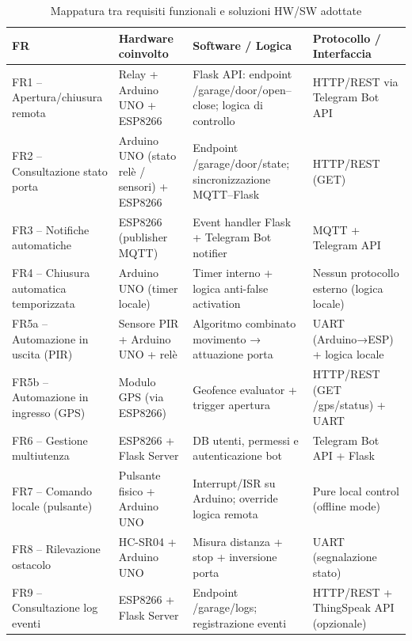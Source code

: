 \begin{table}[H] \centering \caption{Mappatura tra requisiti funzionali e soluzioni HW/SW adottate} \label{tab:fr_hw_sw} \renewcommand{\arraystretch}{1.35} \begin{tabularx}{\textwidth}{@{} p{3.5cm} X X X@{}} \toprule \textbf{FR} & \textbf{Hardware \newline coinvolto} & \textbf{Software / \newline Logica} & \textbf{Protocollo / \newline Interfaccia} \\ \midrule FR1 – Apertura/chiusura remota & Relay + Arduino UNO + ESP8266 & Flask API: endpoint /garage/door/open–close; logica di controllo & HTTP/REST via Telegram Bot API \\ FR2 – Consultazione stato porta & Arduino UNO (stato relè / sensori) + ESP8266 & Endpoint /garage/door/state; sincronizzazione MQTT–Flask & HTTP/REST (GET) \\ FR3 – Notifiche automatiche & ESP8266 (publisher MQTT) & Event handler Flask + Telegram Bot notifier & MQTT + Telegram API \\ FR4 – Chiusura automatica temporizzata & Arduino UNO (timer locale) & Timer interno + logica anti-false activation & Nessun protocollo esterno (logica locale) \\ FR5a – Automazione in uscita (PIR) & Sensore PIR + Arduino UNO + relè & Algoritmo combinato movimento → attuazione porta & UART (Arduino→ESP) + logica locale \\ FR5b – Automazione in ingresso (GPS) & Modulo GPS (via ESP8266) & Geofence evaluator + trigger apertura & HTTP/REST (GET /gps/status) + UART \\ FR6 – Gestione multiutenza & ESP8266 + Flask Server & DB utenti, permessi e autenticazione bot & Telegram Bot API + Flask \\ FR7 – Comando locale (pulsante) & Pulsante fisico + Arduino UNO & Interrupt/ISR su Arduino; override logica remota & Pure local control (offline mode) \\ FR8 – Rilevazione ostacolo & HC-SR04 + Arduino UNO & Misura distanza + stop + inversione porta & UART (segnalazione stato) \\ FR9 – Consultazione log eventi & ESP8266 + Flask Server & Endpoint /garage/logs; registrazione eventi & HTTP/REST + ThingSpeak API (opzionale) \\ \bottomrule \end{tabularx} \end{table} 


